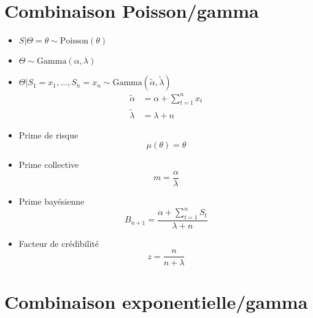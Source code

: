 \section{Combinaison Poisson/gamma}

\begin{itemize}
\item $S|\Theta = \theta \sim \text{Poisson}(\theta)$
\item $\Theta \sim \text{Gamma}(\alpha, \lambda)$
\item $\Theta|S_1 = x_1, \dots, S_n = x_n \sim
  \text{Gamma}(\tilde{\alpha}, \tilde{\lambda})$
  \begin{align*}
    \tilde{\alpha} &= \alpha + \sum_{t = 1}^n x_t \\
    \tilde{\lambda} &= \lambda + n
  \end{align*}
\item Prime de risque
  \begin{equation*}
    \mu(\theta) = \theta
  \end{equation*}
\item Prime collective
  \begin{equation*}
    m = \frac{\alpha}{\lambda}
  \end{equation*}
\item Prime bayésienne
  \begin{equation*}
    B_{n + 1} = \frac{\alpha + \sum_{t = 1}^n S_t}{\lambda + n}
  \end{equation*}
\item Facteur de crédibilité
  \begin{equation*}
    z = \frac{n}{n + \lambda}
  \end{equation*}
\end{itemize}


\section{Combinaison exponentielle/gamma}

